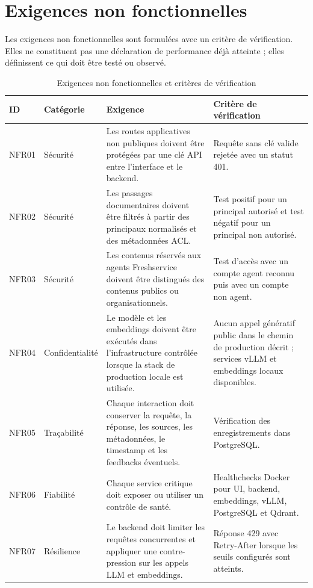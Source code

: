 \section{Exigences non fonctionnelles}

Les exigences non fonctionnelles sont formulées avec un critère de vérification. Elles ne constituent pas une déclaration de performance déjà atteinte ; elles définissent ce qui doit être testé ou observé.

\begin{table}[H]
\centering
\caption{Exigences non fonctionnelles et critères de vérification}
\label{tab:nfr_ch4}
\begin{tabular}{p{1.2cm}p{2cm}p{6.4cm}p{4.1cm}}
\toprule
\textbf{ID} & \textbf{Catégorie} & \textbf{Exigence} & \textbf{Critère de vérification} \\
\midrule
NFR01 & Sécurité & Les routes applicatives non publiques doivent être protégées par une clé API entre l'interface et le backend. & Requête sans clé valide rejetée avec un statut 401. \\
NFR02 & Sécurité & Les passages documentaires doivent être filtrés à partir des principaux normalisés et des métadonnées ACL. & Test positif pour un principal autorisé et test négatif pour un principal non autorisé. \\
NFR03 & Sécurité & Les contenus réservés aux agents Freshservice doivent être distingués des contenus publics ou organisationnels. & Test d'accès avec un compte agent reconnu puis avec un compte non agent. \\
NFR04 & Confidentialité & Le modèle et les embeddings doivent être exécutés dans l'infrastructure contrôlée lorsque la stack de production locale est utilisée. & Aucun appel génératif public dans le chemin de production décrit ; services vLLM et embeddings locaux disponibles. \\
NFR05 & Traçabilité & Chaque interaction doit conserver la requête, la réponse, les sources, les métadonnées, le timestamp et les feedbacks éventuels. & Vérification des enregistrements dans PostgreSQL. \\
NFR06 & Fiabilité & Chaque service critique doit exposer ou utiliser un contrôle de santé. & Healthchecks Docker pour UI, backend, embeddings, vLLM, PostgreSQL et Qdrant. \\
NFR07 & Résilience & Le backend doit limiter les requêtes concurrentes et appliquer une contre-pression sur les appels LLM et embeddings. & Réponse 429 avec Retry-After lorsque les seuils configurés sont atteints. \\

\end{tabular}
\end{table}
